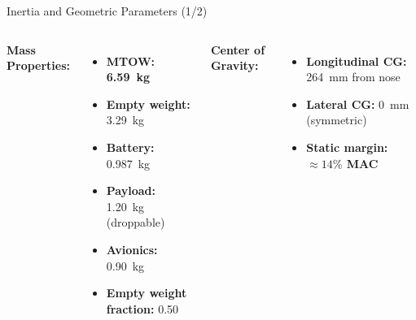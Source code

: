 \documentclass[aspectratio=169,18pt]{beamer}
\begin{document}
\begin{frame}{Inertia and Geometric Parameters (1/2)}

\begin{columns}[T]
\textbf{\color{navymain}Mass Properties:}
\begin{itemize}
\item \textbf{MTOW:} \textcolor{navydeep}{\textbf{\SI{6.59}{\kilo\gram}}}
\item \textbf{Empty weight:} \SI{3.29}{\kilo\gram}
\item \textbf{Battery:} \SI{0.987}{\kilo\gram}
\item \textbf{Payload:} \SI{1.20}{\kilo\gram} (droppable)
\item \textbf{Avionics:} \SI{0.90}{\kilo\gram}
\item \textbf{Empty weight fraction:} 0.50
\end{itemize}

\textbf{\color{navymain}Center of Gravity:}
\begin{itemize}
\item \textbf{Longitudinal CG:} \SI{264}{\milli\meter} from nose
\item \textbf{Lateral CG:} \SI{0}{\milli\meter} (symmetric)
\item \textbf{Static margin:} \textcolor{navydeep}{\textbf{$\approx 14\%$ MAC}}
\end{itemize}
\end{columns}

\vspace{0.5cm}
\begin{center}
\end{center}
\end{frame}
\end{document}

